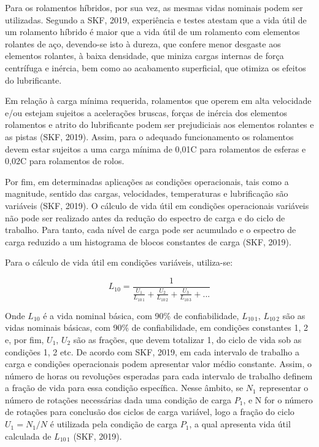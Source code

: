 \documentclass[
	12pt,				
	oneside,			
	a4paper,			
	english,			
	brazil,	
	sumario=abnt-6027-2012		
	]{abntex2ppgsi}
\begin{document}
Para os rolamentos híbridos, por sua vez, as mesmas vidas nominais podem ser utilizadas. Segundo a SKF, 2019, experiência e testes atestam que a vida útil de um rolamento híbrido é maior que a vida útil de um rolamento com elementos rolantes de aço, devendo-se isto à dureza, que confere menor desgaste aos elementos rolantes, à baixa densidade, que miniza cargas internas de força centrífuga e inércia, bem como ao acabamento superficial, que otimiza os efeitos do lubrificante.

Em relação à carga mínima requerida, rolamentos que operem em alta velocidade e/ou estejam sujeitos a acelerações bruscas, forças de inércia dos elementos rolamentos e atrito do lubrificante podem ser prejudiciais aos elementos rolantes e as pistas (SKF, 2019). Assim, para o adequado funcionamento os rolamentos devem estar sujeitos a uma carga mínima de 0,01C para rolamentos de esferas e 0,02C para rolamentos de rolos. 

Por fim, em determinadas aplicações as condições operacionais, tais como a magnitude, sentido das cargas, velocidades, temperaturas e lubrificação são variáveis (SKF, 2019). O cálculo de vida útil em condições operacionais variáveis não pode ser realizado antes da redução do espectro de carga e do ciclo de trabalho. Para tanto, cada nível de carga pode ser acumulado e o espectro de carga reduzido a um histograma de blocos constantes de carga (SKF, 2019).

Para o cálculo de vida útil em condições variáveis, utiliza-se:

\begin{equation}
	L_{10}= \frac{1}{ \frac{U_{1}}{L_{10 \,1}} + \frac{U_{2}}{L_{10 \,2}} + \frac{U_{3}}{L_{10 \,3}} + ...}
	\label{eq:Calculo da vida Util em condições variaveis}
\end{equation}

Onde $L_{10}$ é a vida nominal básica, com 90\% de confiabilidade, $L_{10 \,1}$, $L_{10 \,2}$ são as vidas nominais básicas, com 90\% de confiabilidade, em condições constantes 1, 2 e, por fim, $U_{1}$, $U_{2}$ são as frações, que devem totalizar 1, do ciclo de vida sob as condições 1, 2 etc. De acordo com SKF, 2019, em cada intervalo de trabalho a carga e condições operacionais podem apresentar valor médio constante. Assim, o número de horas ou revoluções esperadas para cada intervalo de trabalho definem a fração de vida para essa condição específica. Nesse âmbito, se ${N_{1}}$ representar o número de rotações necessárias dada uma condição de carga ${P_{1}}$, e N for o número de rotações para conclusão dos ciclos de carga variável, logo a fração do ciclo ${U_{1} = N_{1} / N}$ é utilizada pela condição de carga ${P_{1}}$, a qual apresenta vida útil calculada de ${L_{10 \,1}}$ (SKF, 2019).
\end{document}
